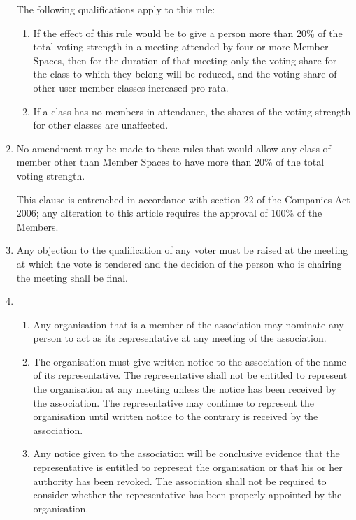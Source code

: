 \begin{enumerate}
    The following qualifications apply to this rule:
    \begin{enumerate}
      \item
        If the effect of this rule would be to give a person more than
        20\% of the total voting strength in a meeting attended by four
        or more Member Spaces, then for the duration of that meeting only
        the voting share for the class to which they belong will be reduced,
        and the voting share of other user member classes increased pro rata.
      \item
        If a class has no members in attendance, the shares of the voting
        strength for other classes are unaffected.
    \end{enumerate}
\item
      No amendment may be made to these rules that would allow any class of
      member other than Member Spaces to have more than 20\% of the total
      voting strength.

      This clause is entrenched in accordance with section 22 of the
      Companies Act 2006; any alteration to this article requires the approval of
      100\% of the Members.
\item
      Any objection to the qualification of any voter must be raised at
      the meeting at which the vote is tendered and the decision of the
      person who is chairing the meeting shall be final.
\item
  \begin{enumerate}
  \item
      Any organisation that is a member of the association may nominate any
      person to act as its representative at any meeting of the association.
  \item
      The organisation must give written notice to the association of the
      name of its representative. The representative shall not be
      entitled to represent the organisation at any meeting unless the
      notice has been received by the association. The representative may
      continue to represent the organisation until written notice to the
      contrary is received by the association.
  \item
      Any notice given to the association will be conclusive evidence that
      the representative is entitled to represent the organisation or
      that his or her authority has been revoked. The association shall not
      be required to consider whether the representative has been
      properly appointed by the organisation.
  \end{enumerate}



\end{enumerate}

